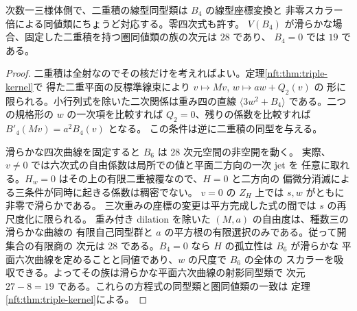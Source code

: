 \begin{corollary}[二重積が記憶する四次曲線]\label{nft:cor:quartic-memory}
次数一三様体側で、二重積の線型同型類は $B_4$ の線型座標変換と
非零スカラー倍による同値類にちょうど対応する。零四次式も許す。
$V(B_4)$ が滑らかな場合、固定した二重積を持つ圏同値類の族の次元は $28$ であり、
$B_4=0$ では $19$ である。
\end{corollary}
\begin{proof}
二重積は全射なのでその核だけを考えればよい。定理\ref{nft:thm:triple-kernel}で
得た二重平面の反標準線束により $v\mapsto Mv$, $w\mapsto aw+Q_2(v)$ の
形に限られる。小行列式を除いた二次関係は重み四の直線
$\langle 3w^2+B_4\rangle$ である。二つの規格形の $w$ の一次項を比較すれば
$Q_2=0$、残りの係数を比較すれば $B'_4(Mv)=a^2B_4(v)$ となる。
この条件は逆に二重積の同型を与える。

滑らかな四次曲線を固定すると $B_6$ は $28$ 次元空間の非空開を動く。
実際、$v\ne0$ では六次式の自由係数は局所での値と平面二方向の一次 jet を
任意に取れる。$H_w=0$ はその上の有限二重被覆なので、$H=0$ と二方向の
偏微分消滅による三条件が同時に起きる係数は稠密でない。
$v=0$ の $Z_H$ 上では $s,w$ がともに非零で滑らかである。
三次重みの座標の変更は平方完成した式の間では $s$ の再尺度化に限られる。
重み付き dilation を除いた $(M,a)$ の自由度は、種数三の滑らかな曲線の
有限自己同型群と $a$ の平方根の有限選択のみである。従って開集合の有限商の
次元は $28$ である。$B_4=0$ なら $H$ の孤立性は $B_6$ が滑らかな
平面六次曲線を定めることと同値であり、$w$ の尺度で $B_6$ の全体の
スカラーを吸収できる。よってその族は滑らかな平面六次曲線の射影同型類で
次元 $27-8=19$ である。これらの方程式の同型類と圏同値類の一致は
定理\ref{nft:thm:triple-kernel}による。
\end{proof}

